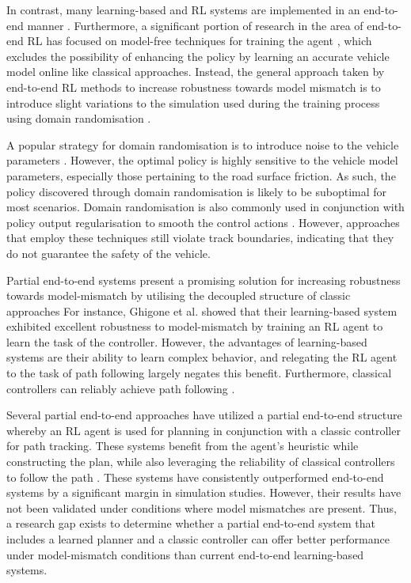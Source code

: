 In contrast, many learning-based and RL systems are implemented in an end-to-end manner \cite{Fuchs2021,Song2021}.
Furthermore, a significant portion of research in the area of end-to-end RL has focused on model-free techniques for training the agent \cite{hsu2022, Chisari2021}, 
which excludes the possibility of enhancing the policy by learning an accurate vehicle model online like classical approaches.
Instead, the general approach taken by end-to-end RL methods to increase robustness towards model mismatch is to 
introduce slight variations to the simulation used during the training process using domain randomisation \cite{Ivanov2020, hsu2022, Chisari2021}.

A popular strategy for domain randomisation is to introduce noise to the vehicle parameters \cite{Chisari2021}. 
However, the optimal policy is highly sensitive to the vehicle model parameters, especially those pertaining to the road surface friction. 
As such, the policy discovered through domain randomisation is likely to be suboptimal for most scenarios.
Domain randomisation is also commonly used in conjunction with policy output regularisation to smooth the control actions \cite{hsu2022, Chisari2021}.
However, approaches that employ these techniques \cite{Ivanov2020, hsu2022, Chisari2021} still violate track boundaries, indicating that they do not guarantee the safety of the vehicle.

Partial end-to-end systems present a promising solution for increasing robustness towards model-mismatch by utilising the decoupled structure of classic approaches
For instance, Ghigone et al. \cite{Ghignone2022} showed that their learning-based system exhibited excellent robustness to model-mismatch by training an RL agent to learn the task of the controller. 
However, the advantages of learning-based systems are their ability to learn complex behavior, and relegating the RL agent to the task of path following largely negates this benefit. 
Furthermore, classical controllers can reliably achieve path following \cite{Coulter_1992, Becker2022, Hoffmann2007}.

Several partial end-to-end approaches \cite{Capo2020, Weiss2020, Weiss2020a, Weiss2022} have utilized a partial end-to-end structure whereby an RL agent is used for planning in conjunction with a classic controller for path tracking. 
These systems benefit from the agent's heuristic while constructing the plan, while also leveraging the reliability of classical controllers to follow the path \cite{Betz2021}.
These systems have consistently outperformed end-to-end systems by a significant margin in simulation studies. 
However, their results have not been validated under conditions where model mismatches are present. 
Thus, a research gap exists to determine whether a partial end-to-end system that includes a learned planner and a classic controller can offer better performance under model-mismatch conditions than current end-to-end learning-based systems.

